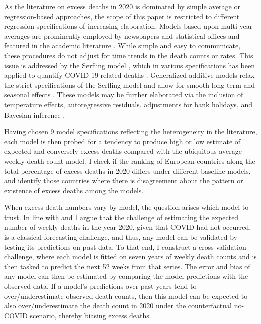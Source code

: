 \documentclass[10pt,letterpaper]{article}
\begin{document}
As the literature on excess deaths in 2020 is dominated by simple average or regression-based approaches, the scope of this paper is restricted to different regression specifications of increasing elaboration. Models based upon multi-year averages are prominently employed by newspapers and statistical offices and featured in the academic literature \cite{Campbell2021, Magnani2020, Michelozzi2020, Modig2020}. While simple and easy to communicate, these procedures do not adjust for time trends in the death counts or rates. This issue is addressed by the Serfling model \cite{Serfling1963}, which in various specifications has been applied to quantify COVID-19 related deaths
\cite{Barnard2020, Weinberger2020, Woolf2020, EuroMoMo2020, Arolas2021}.
Generalized additive models relax the strict specifications of the Serfling model and allow for smooth long-term and seasonal effects \cite{Aburto2021, Scortichini2020}. These models may be further elaborated via the inclusion of temperature effects, autoregressive residuals, adjustments for bank holidays, and Bayesian inference \cite{Kontis2020}.

Having chosen 9 model specifications reflecting the heterogeneity in the literature, each model is then probed for a tendency to produce high or low estimate of expected and conversely excess deaths compared with the ubiquitous average weekly death count model. I check if the ranking of European countries along the total percentage of excess deaths in 2020 differs under different baseline models, and identify those countries where there is disagreement about the pattern or existence of excess deaths among the models.

When excess death numbers vary by model, the question arises which model to trust. In line with \cite{Kontis2020} and \cite{Modi2020} I argue that the challenge of estimating the expected number of weekly deaths in the year 2020, given that COVID had not occurred, is a classical forecasting challenge, and thus, any model can be validated by testing its predictions on past data. To that end, I construct a cross-validation challenge, where each model is fitted on seven years of weekly death counts and is then tasked to predict the next 52 weeks from that series. The error and bias of any model can then be estimated by comparing the model predictions with the observed data. If a model's predictions over past years tend to over/underestimate observed death counts, then this model can be expected to also over/underestimate the death count in 2020 under the counterfactual no-COVID scenario, thereby biasing excess deaths.
\end{document}
